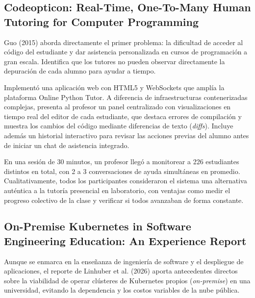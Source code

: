 \subsection{Codeopticon: Real-Time, One-To-Many Human
Tutoring for Computer Programming}
Guo (2015) \cite{guo2015codeopticon} aborda directamente el primer problema: la dificultad de acceder al código del estudiante y dar asistencia personalizada en cursos de programación a gran escala. Identifica que los tutores no pueden observar directamente la depuración de cada alumno para ayudar a tiempo.

Implementó una aplicación web con HTML5 y WebSockets que amplía la plataforma Online Python Tutor. A diferencia de infraestructuras contenerizadas complejas, presenta al profesor un panel centralizado con visualizaciones en tiempo real del editor de cada estudiante, que destaca errores de compilación y muestra los cambios del código mediante diferencias de texto (\textit{diffs}). Incluye además un historial interactivo para revisar las acciones previas del alumno antes de iniciar un chat de asistencia integrado.

En una sesión de 30 minutos, un profesor llegó a monitorear a 226 estudiantes distintos en total, con 2 a 3 conversaciones de ayuda simultáneas en promedio. Cualitativamente, todos los participantes consideraron el sistema una alternativa auténtica a la tutoría presencial en laboratorio, con ventajas como medir el progreso colectivo de la clase y verificar si todos avanzaban de forma constante.


\subsection{On-Premise Kubernetes in Software Engineering Education: An Experience Report}
Aunque se enmarca en la enseñanza de ingeniería de software y el despliegue de aplicaciones, el reporte de Linhuber et al. (2026) \cite{linhuber2026kubernetes} aporta antecedentes directos sobre la viabilidad de operar clústeres de Kubernetes propios (\textit{on-premise}) en una universidad, evitando la dependencia y los costos variables de la nube pública.

